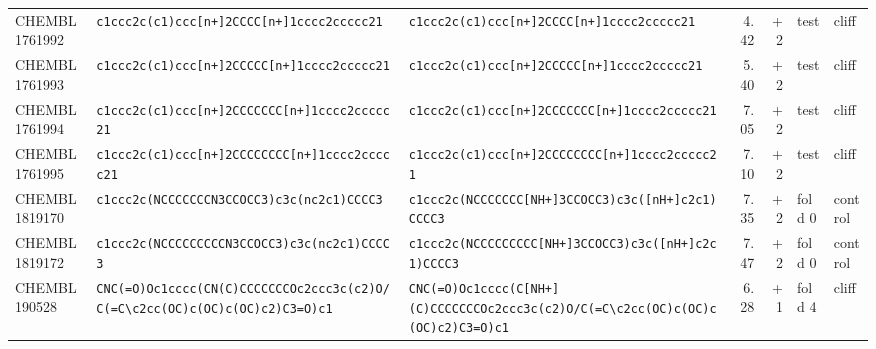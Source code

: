 \begin{longtable}{l p{4.4cm} p{4.4cm} r r l l}
CHEMBL1761992 & \texttt{c1ccc2c(\allowbreak{}c1)\allowbreak{}ccc[n+]\allowbreak{}2CCCC[n+]\allowbreak{}1cccc2ccccc21} & \texttt{c1ccc2c(\allowbreak{}c1)\allowbreak{}ccc[n+]\allowbreak{}2CCCC[n+]\allowbreak{}1cccc2ccccc21} & 4.42 & +2 & test & cliff \\
CHEMBL1761993 & \texttt{c1ccc2c(\allowbreak{}c1)\allowbreak{}ccc[n+]\allowbreak{}2CCCCC[n+]\allowbreak{}1cccc2ccccc21} & \texttt{c1ccc2c(\allowbreak{}c1)\allowbreak{}ccc[n+]\allowbreak{}2CCCCC[n+]\allowbreak{}1cccc2ccccc21} & 5.40 & +2 & test & cliff \\
CHEMBL1761994 & \texttt{c1ccc2c(\allowbreak{}c1)\allowbreak{}ccc[n+]\allowbreak{}2CCCCCCC[n+]\allowbreak{}1cccc2ccccc21} & \texttt{c1ccc2c(\allowbreak{}c1)\allowbreak{}ccc[n+]\allowbreak{}2CCCCCCC[n+]\allowbreak{}1cccc2ccccc21} & 7.05 & +2 & test & cliff \\
CHEMBL1761995 & \texttt{c1ccc2c(\allowbreak{}c1)\allowbreak{}ccc[n+]\allowbreak{}2CCCCCCCC[n+]\allowbreak{}1cccc2ccccc21} & \texttt{c1ccc2c(\allowbreak{}c1)\allowbreak{}ccc[n+]\allowbreak{}2CCCCCCCC[n+]\allowbreak{}1cccc2ccccc21} & 7.10 & +2 & test & cliff \\
CHEMBL1819170 & \texttt{c1ccc2c(\allowbreak{}NCCCCCCCN3CCOCC3)\allowbreak{}c3c(\allowbreak{}nc2c1)\allowbreak{}CCCC3} & \texttt{c1ccc2c(\allowbreak{}NCCCCCCC[NH+]\allowbreak{}3CCOCC3)\allowbreak{}c3c(\allowbreak{}[nH+]\allowbreak{}c2c1)\allowbreak{}CCCC3} & 7.35 & +2 & fold 0 & control \\
CHEMBL1819172 & \texttt{c1ccc2c(\allowbreak{}NCCCCCCCCCN3CCOCC3)\allowbreak{}c3c(\allowbreak{}nc2c1)\allowbreak{}CCCC3} & \texttt{c1ccc2c(\allowbreak{}NCCCCCCCCC[NH+]\allowbreak{}3CCOCC3)\allowbreak{}c3c(\allowbreak{}[nH+]\allowbreak{}c2c1)\allowbreak{}CCCC3} & 7.47 & +2 & fold 0 & control \\
CHEMBL190528 & \texttt{CNC(\allowbreak{}=\allowbreak{}O)\allowbreak{}Oc1cccc(\allowbreak{}CN(\allowbreak{}C)\allowbreak{}CCCCCCCOc2ccc3c(\allowbreak{}c2)\allowbreak{}O/\allowbreak{}C(\allowbreak{}=\allowbreak{}C\textbackslash{}c2cc(\allowbreak{}OC)\allowbreak{}c(\allowbreak{}OC)\allowbreak{}c(\allowbreak{}OC)\allowbreak{}c2)\allowbreak{}C3=\allowbreak{}O)\allowbreak{}c1} & \texttt{CNC(\allowbreak{}=\allowbreak{}O)\allowbreak{}Oc1cccc(\allowbreak{}C[NH+]\allowbreak{}(\allowbreak{}C)\allowbreak{}CCCCCCCOc2ccc3c(\allowbreak{}c2)\allowbreak{}O/\allowbreak{}C(\allowbreak{}=\allowbreak{}C\textbackslash{}c2cc(\allowbreak{}OC)\allowbreak{}c(\allowbreak{}OC)\allowbreak{}c(\allowbreak{}OC)\allowbreak{}c2)\allowbreak{}C3=\allowbreak{}O)\allowbreak{}c1} & 6.28 & +1 & fold 4 & cliff \\

\end{longtable}
